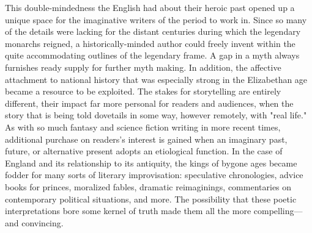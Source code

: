 	This double-mindedness the English had about their heroic past opened up a unique space for the imaginative writers of the period to work in. Since so many of the details were lacking for the distant centuries during which the legendary monarchs reigned, a historically-minded author could freely invent within the quite accommodating outlines of the legendary frame. A gap in a myth always furnishes ready supply for further myth making. In addition, the affective attachment to national history that was especially strong in the Elizabethan age became a resource to be exploited. The stakes for storytelling are entirely different, their impact far more personal for readers and audiences, when the story that is being told dovetails in some way, however remotely, with "real life." As with so much fantasy and science fiction writing in more recent times, additional purchase on readers's interest is gained when an imaginary past, future, or alternative present adopts an etiological function. In the case of England and its relationship to its antiquity, the kings of bygone ages became fodder for many sorts of literary improvisation: speculative chronologies, advice books for princes, moralized fables, dramatic reimaginings, commentaries on contemporary political situations, and more. The possibility that these poetic interpretations  bore some kernel of truth made them all the more compelling—and convincing.

